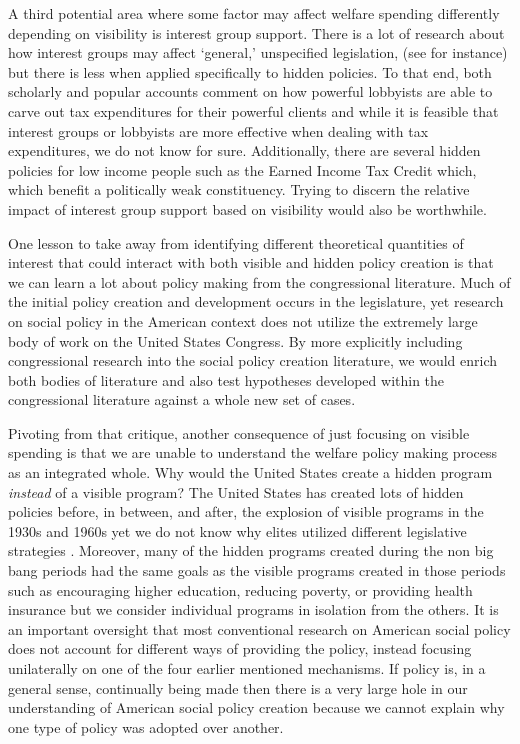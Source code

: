 \documentclass[12pt]{article}
\begin{document}
A third potential area where some factor may affect welfare spending differently depending on visibility is interest group support. There is a lot of research about how interest groups may affect `general,' unspecified legislation, (see \citealt{hall2006} for instance) but there is less when applied specifically to hidden policies. To that end, both scholarly and popular accounts comment on how powerful lobbyists are able to carve out tax expenditures for their  powerful clients \citep{hacker2011, leibovich2013} and while it is feasible that interest groups or lobbyists are more effective when dealing with tax expenditures, we do not know for sure. Additionally, there are several hidden policies for low income people such as the Earned Income Tax Credit which, which benefit a politically weak constituency. Trying to discern the relative impact of interest group support based on visibility would also be worthwhile.

One lesson to take away from identifying different theoretical quantities of interest that could interact with both visible and hidden policy creation is that we can learn a lot about policy making from the congressional literature. Much of the initial policy creation and development occurs in the legislature, yet research on social policy in the American context does not utilize the extremely large body of work on the United States Congress. By more explicitly including congressional research into the social policy creation literature, we would enrich both bodies of literature and also test hypotheses developed within the congressional literature against a whole new set of cases.

Pivoting from that critique, another consequence of just focusing on visible spending is that we are unable to understand the welfare policy making process as an integrated whole. Why would the United States create a hidden program \emph{instead} of a visible program? The United States has created lots of hidden policies before, in between, and after, the explosion of visible programs in the 1930s and 1960s yet we do not know why elites utilized different legislative strategies \citep[Ch. 2]{howard2008}. Moreover, many of the hidden programs created during the non big bang periods had the same goals as the visible programs created in those periods such as encouraging higher education, reducing poverty, or providing health insurance but we consider individual programs in isolation from the others. It is an important oversight that most conventional research on American social policy does not account for different ways of providing the policy, instead focusing unilaterally on one of the four earlier mentioned mechanisms. If policy is, in a general sense, continually being made then there is a very large hole in our understanding of American social policy creation because we cannot explain why one type of policy was adopted over another.
\end{document}
